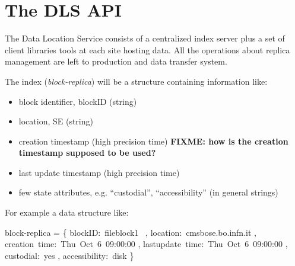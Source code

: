 \documentclass[pdftex]{cmspaper}
\begin{document}
\section{The DLS API}
\label{sec:dlsapi}

The Data Location Service consists of a centralized index 
server plus a set of client libraries tools at each site hosting data. 
All the operations about replica management are left to production
and data transfer system.

The index ({\em block-replica}) will be a structure containing 
information like: 
\begin{itemize}
\item block identifier, blockID  (string)
\item location, SE (string)
\item creation timestamp  (high precision time)  {\bf FIXME: how is the creation timestamp supposed to be used?}
\item last update timestamp (high precision time)
\item few state attributes, e.g. ``custodial'', ``accessibility'' (in general strings)
\end{itemize}

For example a data structure like:
\begin{flushleft}
\mbox{block-replica} = \{
     \mbox{blockID: fileblock1 } ,
     \mbox{location: cmsbose.bo.infn.it} ,
     \mbox{creation time:   Thu Oct 6 09:00:00} ,
     \mbox{lastupdate time: Thu Oct 6 09:00:00} ,
     \mbox{custodial:       yes} ,
     \mbox{accessibility:   disk}
 \}
\end{flushleft}
\end{document}
